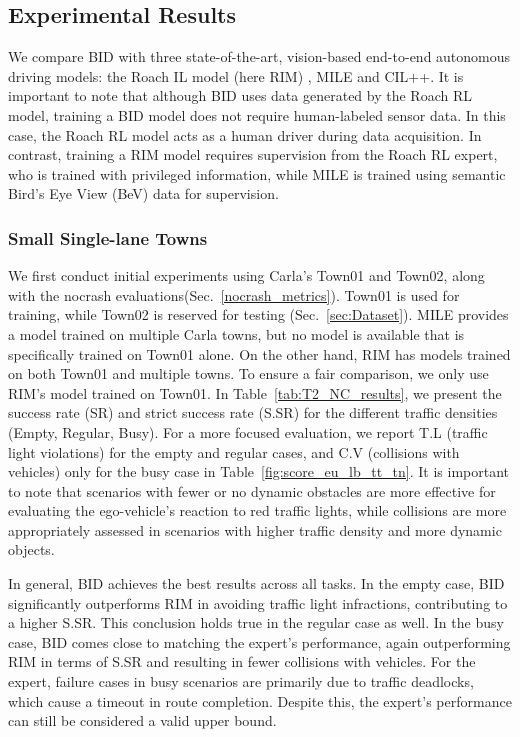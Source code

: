 \subsection{Experimental Results}
\label{sec:Results}
\hspace{1pc}We compare BID with three state-of-the-art, vision-based end-to-end autonomous driving models: the Roach IL model (here RIM) \cite{Zhang:2021}, MILE \cite{Hu:2022} and CIL++\cite{xiao2023scaling}. 
It is important to note that although BID uses data generated by the Roach RL model, training a BID model does not require human-labeled sensor data. 
In this case, the Roach RL model acts as a human driver during data acquisition. 
In contrast, training a RIM model requires supervision from the Roach RL expert, who is trained with privileged information, while MILE is trained using semantic Bird's Eye View (BeV) data for supervision.


\subsubsection{Small Single-lane Towns} \label{sec:small_town_results}

\hspace{1pc}We first conduct initial experiments using Carla's Town01 and Town02, along with the nocrash evaluations(Sec.~\ref{nocrash_metrics}). 
Town01 is used for training, while Town02 is reserved for testing (Sec.~\ref{sec:Dataset}). 
MILE provides a model trained on multiple Carla towns, but no model is available that is specifically trained on Town01 alone. 
On the other hand, RIM has models trained on both Town01 and multiple towns. To ensure a fair comparison, we only use RIM's model trained on Town01. 
In Table~\ref{tab:T2_NC_results}, we present the success rate (SR) and strict success rate (S.SR) for the different traffic densities (Empty, Regular, Busy). 
For a more focused evaluation, we report T.L (traffic light violations) for the empty and regular cases, and C.V (collisions with vehicles) only for the busy case in Table~\ref{fig:score_eu_lb_tt_tn}. 
It is important to note that scenarios with fewer or no dynamic obstacles are more effective for evaluating the ego-vehicle's reaction to red traffic lights, while collisions are more appropriately assessed in scenarios with higher traffic density and more dynamic objects.


In general, BID achieves the best results across all tasks. 
In the empty case, BID significantly outperforms RIM in avoiding traffic light infractions, contributing to a higher S.SR.
This conclusion holds true in the regular case as well. 
In the busy case, BID comes close to matching the expert's performance, again outperforming RIM in terms of S.SR and resulting in fewer collisions with vehicles. 
For the expert, failure cases in busy scenarios are primarily due to traffic deadlocks, which cause a timeout in route completion. 
Despite this, the expert's performance can still be considered a valid upper bound.


